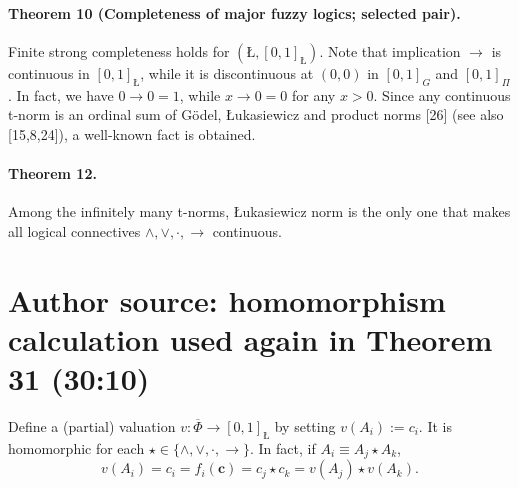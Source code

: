 \documentclass[10pt,a4paper]{article}
\newcommand{\Luk}{\text{\L}}
\begin{document}
\paragraph{Theorem 10 (Completeness of major fuzzy logics; selected pair).}
Finite strong completeness holds for $(\Luk,[0,1]_{\Luk})$.
Note that implication $\to$ is continuous in $[0,1]_{\Luk}$, while it is discontinuous at $(0,0)$ in $[0,1]_G$ and $[0,1]_{\Pi}$. In fact, we have $0\to0=1$, while $x\to0=0$ for any $x>0$. Since any continuous t-norm is an ordinal sum of Gödel, Łukasiewicz and product norms [26] (see also [15,8,24]), a well-known fact is obtained.
\paragraph{Theorem 12.} Among the infinitely many t-norms, Łukasiewicz norm is the only one that makes all logical connectives $\wedge,\vee,\cdot,\to$ continuous.
\section*{Author source: homomorphism calculation used again in Theorem 31 (30:10)}
Define a (partial) valuation $v:\overline\Phi\to[0,1]_{\Luk}$ by setting $v(A_i):=c_i$. It is homomorphic for each $\star\in\{\wedge,\vee,\cdot,\to\}$. In fact, if $A_i\equiv A_j\star A_k$,
\[
v(A_i)=c_i=f_i(\mathbf c)=c_j\star c_k=v(A_j)\star v(A_k).
\]
\end{document}

